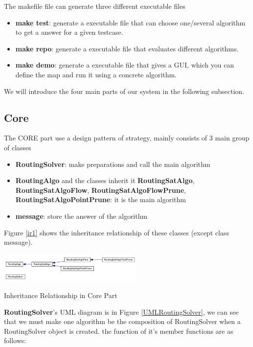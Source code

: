 \documentclass[twocolumn]{article}
\begin{document}
The makefile file can generate three different executable files

\begin{itemize}
    \item \textbf{make test}: generate a executable file that can choose one/several algorithm to get a answer for a given testcase.
    \item \textbf{make repo}: generate a executable file that evaluates different algorithms.
    \item \textbf{make demo}: generate a executable file that gives a GUI, which you can define the map and run it using a concrete algorithm.
\end{itemize}

We will introduce the four main parts of our system in the following subsection.

\subsection{Core}

The CORE part use a design pattern of strategy, mainly consists of 3 main group of classes

\begin{itemize}
    \item \textbf{RoutingSolver}: make preparations and call the main algorithm
    \item \textbf{RoutingAlgo} and the classes inherit it \textbf{RoutingSatAlgo}, \textbf{RoutingSatAlgoFlow}, \textbf{RoutingSatAlgoFlowPrune}, \textbf{RoutingSatAlgoPointPrune}: it is the main algorithm
    \item \textbf{message}: store the answer of the algorithm
\end{itemize}

Figure \ref{ir1} shows the inheritance relationship of these classes (except class message).

\begin{center}
\makeatletter
\def\@captype{figure}
\makeatother
\includegraphics [height=1.5cm]{ir1}
\caption{Inheritance Relationship in Core Part}
\label{ir1}
\end{center}

\textbf{RoutingSolver}'s UML diagram is in Figure \ref{UMLRoutingSolver}, we can see that we must make one algorithm be the composition of RoutingSolver when a RoutingSolver object is created. the function of it's member functions are as follows:
\end{document}
